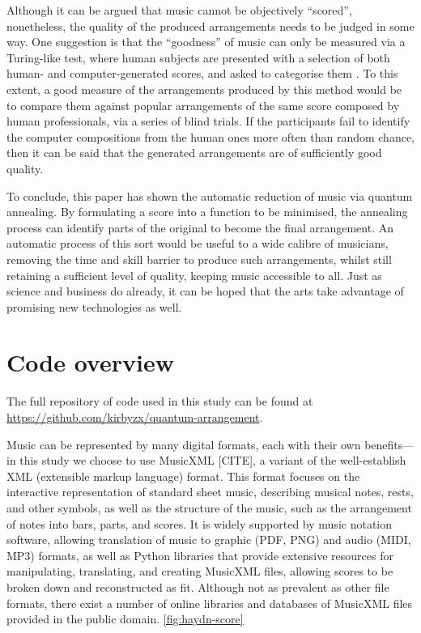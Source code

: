 \documentclass[12pt]{article}
\theoremstyle{definition}
\begin{document}
Although it can be argued that music cannot be objectively ``scored'', nonetheless, the quality of the produced arrangements needs to be judged in some way. One suggestion is that the ``goodness'' of music can only be measured via a Turing-like test, where human subjects are presented with a selection of both human- and computer-generated scores, and asked to categorise them . To this extent, a good measure of the arrangements produced by this method would be to compare them against popular arrangements of the same score composed by human professionals, via a series of blind trials. If the participants fail to identify the computer compositions from the human ones more often than random chance, then it can be said that the generated arrangements are of sufficiently good quality.

To conclude, this paper has shown the automatic reduction of music via quantum annealing. By formulating a score into a function to be minimised, the annealing process can identify parts of the original to become the final arrangement. An automatic process of this sort would be useful to a wide calibre of musicians, removing the time and skill barrier to produce such arrangements, whilst still retaining a sufficient level of quality, keeping music accessible to all. Just as science and business do already, it can be hoped that the arts take advantage of promising new technologies as well.

\printbibliography[heading=bibintoc]

\clearpage
\appendix
\setcounter{figure}{0}

\section{Code overview}
\label{app:code}

The full repository of code used in this study can be found at \url{https://github.com/kirbyzx/quantum-arrangement}.

Music can be represented by many digital formats, each with their own benefits---in this study we choose to use MusicXML [CITE], a variant of the well-establish XML (extensible markup language) format. This format focuses on the interactive representation of standard sheet music, describing musical notes, rests, and other symbols, as well as the structure of the music, such as the arrangement of notes into bars, parts, and scores. It is widely supported by music notation software, allowing translation of music to graphic (PDF, PNG) and audio (MIDI, MP3) formats, as well as Python libraries that provide extensive resources for manipulating, translating, and creating MusicXML files, allowing scores to be broken down and reconstructed as fit. Although not as prevalent as other file formats, there exist a number of online libraries and databases of MusicXML files provided in the public domain. \cref{fig:haydn-score}
\end{document}
